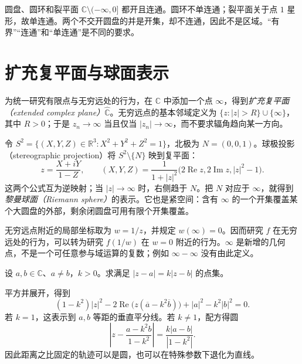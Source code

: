 \begin{example}[几个典型区域]
圆盘、圆环和裂平面 $\mathbb{C}\setminus(-\infty,0]$ 都开且连通。圆环不单连通；裂平面关于点 $1$ 星形，故单连通。两个不交开圆盘的并是开集，却不连通，因此不是区域。“有界”“连通”和“单连通”是不同的要求。
\end{example}

\section{扩充复平面与球面表示}

为统一研究有限点与无穷远处的行为，在 $\mathbb{C}$ 中添加一个点 $\infty$，得到\emph{扩充复平面（extended complex plane）}$\widehat{\mathbb{C}}$。无穷远点的基本邻域定义为 $\{z:|z|>R\}\cup\{\infty\}$，其中 $R>0$；于是 $z_n\to\infty$ 当且仅当 $|z_n|\to\infty$，而不要求辐角趋向某一方向。

令 $S^2=\{(X,Y,Z)\in\mathbb{R}^3:X^2+Y^2+Z^2=1\}$，北极为 $N=(0,0,1)$。球极投影（stereographic projection）将 $S^2\setminus\{N\}$ 映到复平面：
\begin{equation}
 z=\frac{X+iY}{1-Z},\qquad
 (X,Y,Z)=\frac{1}{1+|z|^2}
 \bigl(2\operatorname{Re}z,2\operatorname{Im}z,|z|^2-1\bigr).
 \label{eq:ca-stereographic}
\end{equation}
这两个公式互为逆映射；当 $|z|\to\infty$ 时，右侧趋于 $N$。把 $N$ 对应于 $\infty$，就得到\emph{黎曼球面（Riemann sphere）}的表示。它也是紧空间：含有 $\infty$ 的一个开集覆盖某个大圆盘的外部，剩余闭圆盘可用有限个开集覆盖。

无穷远点附近的局部坐标取为 $w=1/z$，并规定 $w(\infty)=0$。因而研究 $f$ 在无穷远处的行为，可以转为研究 $f(1/w)$ 在 $w=0$ 附近的行为。$\infty$ 是新增的几何点，不是一个可任意参与域运算的复数；例如 $\infty-\infty$ 没有由此定义。

\begin{example}[阿波罗尼斯圆]
设 $a,b\in\mathbb{C}$、$a\ne b$，$k>0$。求满足 $|z-a|=k|z-b|$ 的点集。
\end{example}
\begin{solve}
平方并展开，得到
\[
 (1-k^2)|z|^2-2\operatorname{Re}\bigl(z(\overline a-k^2\overline b)\bigr)
 +|a|^2-k^2|b|^2=0.
\]
若 $k=1$，这表示到 $a,b$ 等距的垂直平分线。若 $k\ne1$，配方得圆
\[
 \left|z-\frac{a-k^2b}{1-k^2}\right|=\frac{k|a-b|}{|1-k^2|}.
\]
因此距离之比固定的轨迹可以是圆，也可以在特殊参数下退化为直线。
\end{solve}

